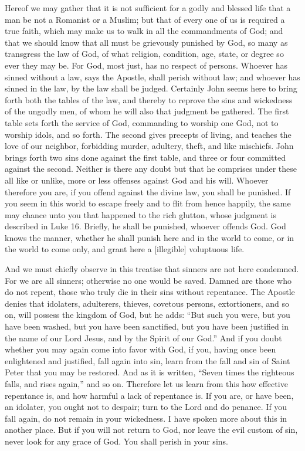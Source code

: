 Hereof we may gather that it is not sufficient for a godly and blessed life that a man be not a Romanist or a Muslim; but that of every one of us is required a true faith, which may make us to walk in all the commandments of God; and that we should know that all must be grievously punished by God, so many as transgress the law of God, of what religion, condition, age, state, or degree so ever they may be. For God, most just, has no respect of persons. Whoever has sinned without a law, says the Apostle, shall perish without law; and whoever has sinned in the law, by the law shall be judged. Certainly John seems here to bring forth both the tables of the law, and thereby to reprove the sins and wickedness of the ungodly men, of whom he will also that judgment be gathered. The first table sets forth the service of God, commanding to worship one God, not to worship idols, and so forth. The second gives precepts of living, and teaches the love of our neighbor, forbidding murder, adultery, theft, and like mischiefs. John brings forth two sins done against the first table, and three or four committed against the second. Neither is there any doubt but that he comprises under these all like or unlike, more or less offenses against God and his will. Whoever therefore you are, if you offend against the divine law, you shall be punished. If you seem in this world to escape freely and to flit from hence happily, the same may chance unto you that happened to the rich glutton, whose judgment is described in Luke 16. Briefly, he shall be punished, whoever offends God. God knows the manner, whether he shall punish here and in the world to come, or in the world to come only, and grant here a [illegible] voluptuous life.

And we must chiefly observe in this treatise that sinners are not here condemned. For we are all sinners; otherwise no one would be saved. Damned are those who do not repent, those who truly die in their sins without repentance. The Apostle denies that idolaters, adulterers, thieves, covetous persons, extortioners, and so on, will possess the kingdom of God, but he adds: “But such you were, but you have been washed, but you have been sanctified, but you have been justified in the name of our Lord Jesus, and by the Spirit of our God.” And if you doubt whether you may again come into favor with God, if you, having once been enlightened and justified, fall again into sin, learn from the fall and sin of Saint Peter that you may be restored. And as it is written, “Seven times the righteous falls, and rises again,” and so on. Therefore let us learn from this how effective repentance is, and how harmful a lack of repentance is. If you are, or have been, an idolater, you ought not to despair; turn to the Lord and do penance. If you fall again, do not remain in your wickedness. I have spoken more about this in another place. But if you will not return to God, nor leave the evil custom of sin, never look for any grace of God. You shall perish in your sins.

